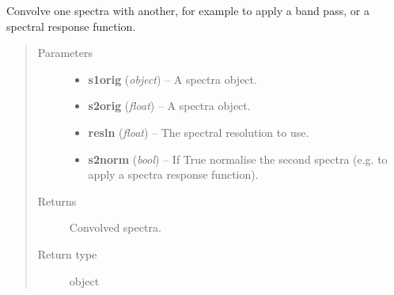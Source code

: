 \documentclass[letterpaper,10pt,english]{sphinxmanual}
\begin{document}
\begin{fulllineitems}
\label{source/sentinelSimulator:sentinelSimulator.spectra.convolve}
Convolve one spectra with another, for example
to apply a band pass, or a spectral response function.
\begin{quote}\begin{description}
\item[{Parameters}] \leavevmode\begin{itemize}
\item {} 
\textbf{s1orig} (\emph{object}) -- A spectra object.

\item {} 
\textbf{s2orig} (\emph{float}) -- A spectra object.

\item {} 
\textbf{resln} (\emph{float}) -- The spectral resolution to use.

\item {} 
\textbf{s2norm} (\emph{bool}) -- If True normalise the second spectra (e.g. to apply a spectra response function).

\end{itemize}

\item[{Returns}] \leavevmode
Convolved spectra.

\item[{Return type}] \leavevmode
object

\end{description}\end{quote}

\end{fulllineitems}


\begin{fulllineitems}
\label{source/sentinelSimulator:sentinelSimulator.spectra.sentinel2}
\end{fulllineitems}

\end{document}
